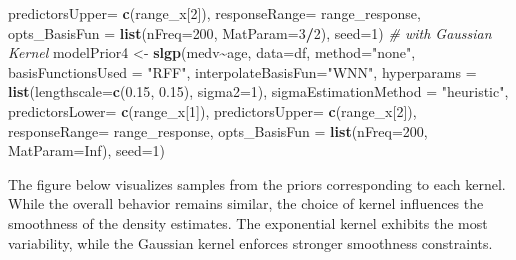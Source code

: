\documentclass[
]{article}
\newenvironment{Shaded}{\begin{snugshade}}{\end{snugshade}}
\newcommand{\AttributeTok}[1]{\textcolor[rgb]{0.13,0.29,0.53}{#1}}
\newcommand{\CommentTok}[1]{\textcolor[rgb]{0.56,0.35,0.01}{\textit{#1}}}
\newcommand{\ConstantTok}[1]{\textcolor[rgb]{0.56,0.35,0.01}{#1}}
\newcommand{\DecValTok}[1]{\textcolor[rgb]{0.00,0.00,0.81}{#1}}
\newcommand{\FloatTok}[1]{\textcolor[rgb]{0.00,0.00,0.81}{#1}}
\newcommand{\FunctionTok}[1]{\textcolor[rgb]{0.13,0.29,0.53}{\textbf{#1}}}
\newcommand{\NormalTok}[1]{#1}
\newcommand{\OtherTok}[1]{\textcolor[rgb]{0.56,0.35,0.01}{#1}}
\newcommand{\SpecialCharTok}[1]{\textcolor[rgb]{0.81,0.36,0.00}{\textbf{#1}}}
\newcommand{\StringTok}[1]{\textcolor[rgb]{0.31,0.60,0.02}{#1}}
\begin{document}
\begin{Shaded}
\begin{Highlighting}[]
                    \AttributeTok{predictorsUpper=} \FunctionTok{c}\NormalTok{(range\_x[}\DecValTok{2}\NormalTok{]),}
                    \AttributeTok{responseRange=}\NormalTok{ range\_response,}
                    \AttributeTok{opts\_BasisFun =} \FunctionTok{list}\NormalTok{(}\AttributeTok{nFreq=}\DecValTok{200}\NormalTok{,}
                                         \AttributeTok{MatParam=}\DecValTok{3}\SpecialCharTok{/}\DecValTok{2}\NormalTok{),}
                    \AttributeTok{seed=}\DecValTok{1}\NormalTok{)}
\CommentTok{\# with Gaussian Kernel}
\NormalTok{modelPrior4 }\OtherTok{\textless{}{-}} \FunctionTok{slgp}\NormalTok{(medv}\SpecialCharTok{\textasciitilde{}}\NormalTok{age, }
                    \AttributeTok{data=}\NormalTok{df,}
                    \AttributeTok{method=}\StringTok{"none"}\NormalTok{, }
                    \AttributeTok{basisFunctionsUsed =} \StringTok{"RFF"}\NormalTok{,}
                    \AttributeTok{interpolateBasisFun=}\StringTok{"WNN"}\NormalTok{, }
                    \AttributeTok{hyperparams =} \FunctionTok{list}\NormalTok{(}\AttributeTok{lengthscale=}\FunctionTok{c}\NormalTok{(}\FloatTok{0.15}\NormalTok{, }\FloatTok{0.15}\NormalTok{), }
                                       \AttributeTok{sigma2=}\DecValTok{1}\NormalTok{), }
                    \AttributeTok{sigmaEstimationMethod =} \StringTok{"heuristic"}\NormalTok{, }
                    \AttributeTok{predictorsLower=} \FunctionTok{c}\NormalTok{(range\_x[}\DecValTok{1}\NormalTok{]),}
                    \AttributeTok{predictorsUpper=} \FunctionTok{c}\NormalTok{(range\_x[}\DecValTok{2}\NormalTok{]),}
                    \AttributeTok{responseRange=}\NormalTok{ range\_response,}
                    \AttributeTok{opts\_BasisFun =} \FunctionTok{list}\NormalTok{(}\AttributeTok{nFreq=}\DecValTok{200}\NormalTok{,}
                                         \AttributeTok{MatParam=}\ConstantTok{Inf}\NormalTok{),}
                    \AttributeTok{seed=}\DecValTok{1}\NormalTok{)}
\end{Highlighting}
\end{Shaded}

The figure below visualizes samples from the priors corresponding to each kernel. While the overall behavior remains similar, the choice of kernel influences the smoothness of the density estimates. The exponential kernel exhibits the most variability, while the Gaussian kernel enforces stronger smoothness constraints.
\end{document}
